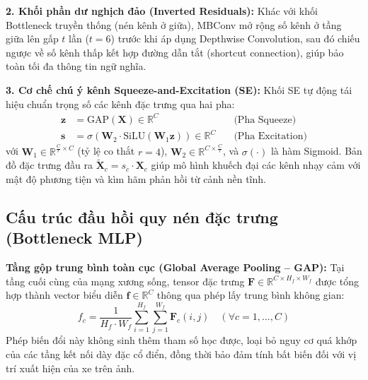 \textbf{2. Khối phần dư nghịch đảo (Inverted Residuals):}
Khác với khối Bottleneck truyền thống (nén kênh ở giữa), MBConv mở rộng số kênh ở tầng giữa lên gấp $t$ lần ($t=6$) trước khi áp dụng Depthwise Convolution, sau đó chiếu ngược về số kênh thấp kết hợp đường dẫn tắt (shortcut connection), giúp bảo toàn tối đa thông tin ngữ nghĩa.

\textbf{3. Cơ chế chú ý kênh Squeeze-and-Excitation (SE):}
Khối SE tự động tái hiệu chuẩn trọng số các kênh đặc trưng qua hai pha:
\begin{align}
    \mathbf{z} &= \text{GAP}(\mathbf{X}) \in \mathbb{R}^C \quad &\text{(Pha Squeeze)} \\
    \mathbf{s} &= \sigma\left( \mathbf{W}_2 \cdot \text{SiLU}(\mathbf{W}_1 \mathbf{z}) \right) \in \mathbb{R}^C \quad &\text{(Pha Excitation)}
\end{align}
với $\mathbf{W}_1 \in \mathbb{R}^{\frac{C}{r} \times C}$ (tỷ lệ co thắt $r=4$), $\mathbf{W}_2 \in \mathbb{R}^{C \times \frac{C}{r}}$, và $\sigma(\cdot)$ là hàm Sigmoid. Bản đồ đặc trưng đầu ra $\tilde{\mathbf{X}}_c = s_c \cdot \mathbf{X}_c$ giúp mô hình khuếch đại các kênh nhạy cảm với mật độ phương tiện và kìm hãm phản hồi từ cảnh nền tĩnh.

\subsection{Cấu trúc đầu hồi quy nén đặc trưng (Bottleneck MLP)}
\label{sec:bottleneck_mlp}

\textbf{Tầng gộp trung bình toàn cục (Global Average Pooling -- GAP):}
Tại tầng cuối cùng của mạng xương sống, tensor đặc trưng $\mathbf{F} \in \mathbb{R}^{C \times H_f \times W_f}$ được tổng hợp thành vector biểu diễn $\mathbf{f} \in \mathbb{R}^C$ thông qua phép lấy trung bình không gian:
\begin{equation}
    f_c = \frac{1}{H_f \cdot W_f} \sum_{i=1}^{H_f} \sum_{j=1}^{W_f} \mathbf{F}_c(i, j) \quad (\forall c = 1, \dots, C)
\end{equation}
Phép biến đổi này không sinh thêm tham số học được, loại bỏ nguy cơ quá khớp của các tầng kết nối dày đặc cổ điển, đồng thời bảo đảm tính bất biến đối với vị trí xuất hiện của xe trên ảnh.


